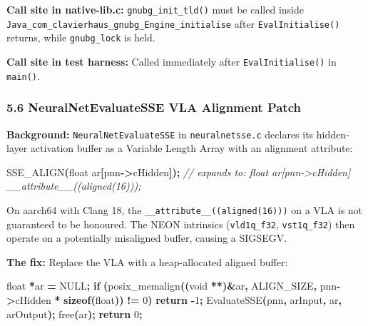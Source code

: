 \documentclass[11pt,a4paper]{article}
\newenvironment{Shaded}{%
  \setlength{\FrameSep}{4pt}%
  \definecolor{shadecolor}{RGB}{245,245,245}%
  \begin{snugshade}\footnotesize
}{\end{snugshade}}
\newcommand{\CommentTok}[1]{\textcolor[rgb]{0.56,0.35,0.01}{\textit{#1}}}
\newcommand{\ControlFlowTok}[1]{\textcolor[rgb]{0.13,0.29,0.53}{\textbf{#1}}}
\newcommand{\DataTypeTok}[1]{\textcolor[rgb]{0.13,0.29,0.53}{#1}}
\newcommand{\DecValTok}[1]{\textcolor[rgb]{0.00,0.00,0.81}{#1}}
\newcommand{\KeywordTok}[1]{\textcolor[rgb]{0.13,0.29,0.53}{\textbf{#1}}}
\newcommand{\NormalTok}[1]{#1}
\newcommand{\OperatorTok}[1]{\textcolor[rgb]{0.81,0.36,0.00}{\textbf{#1}}}
\begin{document}
\textbf{Call site in native-lib.c:} \texttt{gnubg\_init\_tld()} must be
called inside \texttt{Java\_com\_clavierhaus\_gnubg\_Engine\_initialise}
after \texttt{EvalInitialise()} returns, while \texttt{gnubg\_lock} is
held.

\textbf{Call site in test harness:} Called immediately after
\texttt{EvalInitialise()} in \texttt{main()}.

\subsubsection{5.6 NeuralNetEvaluateSSE VLA Alignment
Patch}\label{neuralnetevaluatesse-vla-alignment-patch}

\textbf{Background:} \texttt{NeuralNetEvaluateSSE} in
\texttt{neuralnetsse.c} declares its hidden-layer activation buffer as a
Variable Length Array with an alignment attribute:

\begin{Shaded}
\begin{Highlighting}[]
\NormalTok{SSE\_ALIGN}\OperatorTok{(}\DataTypeTok{float}\NormalTok{ ar}\OperatorTok{[}\NormalTok{pnn}\OperatorTok{{-}\textgreater{}}\NormalTok{cHidden}\OperatorTok{]);}
\CommentTok{// expands to: float ar[pnn{-}\textgreater{}cHidden] \_\_attribute\_\_((aligned(16)));}
\end{Highlighting}
\end{Shaded}

On aarch64 with Clang 18, the \texttt{\_\_attribute\_\_((aligned(16)))}
on a VLA is not guaranteed to be honoured. The NEON intrinsics
(\texttt{vld1q\_f32}, \texttt{vst1q\_f32}) then operate on a potentially
misaligned buffer, causing a SIGSEGV.

\textbf{The fix:} Replace the VLA with a heap-allocated aligned buffer:

\begin{Shaded}
\begin{Highlighting}[]
\DataTypeTok{float} \OperatorTok{*}\NormalTok{ar }\OperatorTok{=}\NormalTok{ NULL}\OperatorTok{;}
\ControlFlowTok{if} \OperatorTok{(}\NormalTok{posix\_memalign}\OperatorTok{((}\DataTypeTok{void} \OperatorTok{**)\&}\NormalTok{ar}\OperatorTok{,}\NormalTok{ ALIGN\_SIZE}\OperatorTok{,}\NormalTok{ pnn}\OperatorTok{{-}\textgreater{}}\NormalTok{cHidden }\OperatorTok{*} \KeywordTok{sizeof}\OperatorTok{(}\DataTypeTok{float}\OperatorTok{))} \OperatorTok{!=} \DecValTok{0}\OperatorTok{)}
    \ControlFlowTok{return} \OperatorTok{{-}}\DecValTok{1}\OperatorTok{;}
\NormalTok{EvaluateSSE}\OperatorTok{(}\NormalTok{pnn}\OperatorTok{,}\NormalTok{ arInput}\OperatorTok{,}\NormalTok{ ar}\OperatorTok{,}\NormalTok{ arOutput}\OperatorTok{);}
\NormalTok{free}\OperatorTok{(}\NormalTok{ar}\OperatorTok{);}
\ControlFlowTok{return} \DecValTok{0}\OperatorTok{;}
\end{Highlighting}
\end{Shaded}
\end{document}
